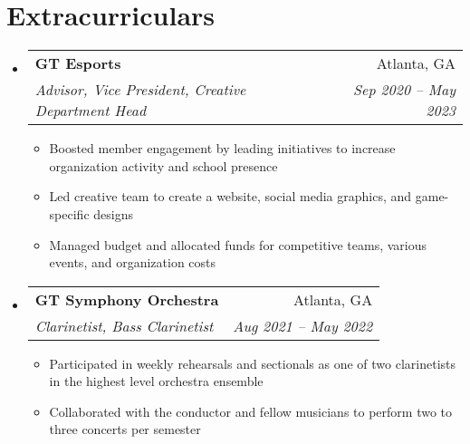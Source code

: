 \documentclass[letter,11pt]{extarticle}
\makeatletter
\newcommand{\resumeItem}[1]{
	\item\small{
		#1 \vspace{-1pt}
	}
}
\newcommand{\resumeProjectHeading}[3]{
	\vspace{-3pt}\item
		\begin{tabular*}{1\linewidth}{l@{\extracolsep{\fill}}r}
			\textbf{#1} $|$ \emph{#2} & #3 \\
		\end{tabular*}\vspace{-3pt}
}
\newcommand{\resumeSubheading}[4]{
	\vspace{-1pt}\item
		\begin{tabular*}{1\linewidth}{l@{\extracolsep{\fill}}r}
			\textbf{#1} & #2 \\
			\textit{#3} & \textit{#4} \\
		\end{tabular*}\vspace{-3pt}
}
\newcommand{\resumeSubHeadingListStart}{\begin{itemize}[leftmargin=0.15in,label={}]}
\newcommand{\resumeSubHeadingListEnd}{\end{itemize}}
\newcommand{\resumeItemListStart}{\begin{itemize}\vspace{-3pt}}
\newcommand{\resumeItemListEnd}{\end{itemize}\vspace{-3pt}}
\makeatother
\begin{document}
\section{Extracurriculars}
	\resumeSubHeadingListStart
        \resumeSubheading
            {GT Esports}
            {Atlanta, GA}
            {Advisor, Vice President, Creative Department Head}
            {Sep 2020 -- May 2023}
        \resumeItemListStart
            \resumeItem{Boosted member engagement by leading
            initiatives to increase organization activity and school presence}
            \resumeItem{Led creative team to create a website, social
                media graphics, and game-specific designs}
             \resumeItem{Managed budget and allocated funds for competitive teams, various events,
                and organization costs}
        \resumeItemListEnd
        \resumeSubheading
            {GT Symphony Orchestra}
            {Atlanta, GA}
            {Clarinetist, Bass Clarinetist}
            {Aug 2021 -- May 2022}
        \resumeItemListStart
            \resumeItem{Participated in weekly rehearsals and sectionals as one of two clarinetists in the highest level orchestra ensemble}
            \resumeItem{Collaborated with the conductor and fellow musicians to perform two to three concerts per semester}
        \resumeItemListEnd
	\resumeSubHeadingListEnd


\end{document}
